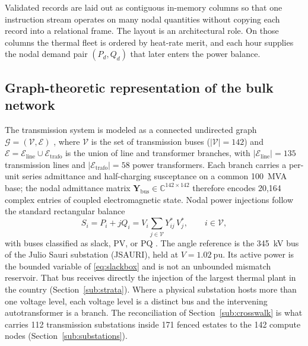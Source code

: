 Validated records are laid out as contiguous in-memory columns so that one instruction stream operates on many nodal quantities without copying each record into a relational frame. The layout is an architectural role. On those columns the thermal fleet is ordered by heat-rate merit, and each hour supplies the nodal demand pair $(P_d, Q_d)$ that later enters the power balance.

\subsection{Graph-theoretic representation of the bulk network}
\label{sub:graph}

The transmission system is modeled as a connected undirected graph $\mathcal{G} = (\mathcal{V}, \mathcal{E})$ \cite{newman2010}, where $\mathcal{V}$ is the set of transmission buses ($|\mathcal{V}| = 142$) and $\mathcal{E} = \mathcal{E}_{\mathrm{line}} \cup \mathcal{E}_{\mathrm{trafo}}$ is the union of line and transformer branches, with $|\mathcal{E}_{\mathrm{line}}| = 135$ transmission lines and $|\mathcal{E}_{\mathrm{trafo}}| = 58$ power transformers. Each branch carries a per-unit series admittance and half-charging susceptance on a common 100~MVA base; the nodal admittance matrix $\mathbf{Y}_{\mathrm{bus}} \in \mathbb{C}^{142 \times 142}$ therefore encodes 20,164 complex entries of coupled electromagnetic state. Nodal power injections follow the standard rectangular balance
\begin{equation}
S_i = P_i + jQ_i = V_i \sum_{j \in \mathcal{V}} Y_{ij}^{*}\, V_j^{*}, \qquad i \in \mathcal{V},
\label{eq:balance}
\end{equation}
with buses classified as slack, PV, or PQ \cite{tinney1967}. The angle reference is the 345~kV bus of the Julio Sauri substation (JSAURI), held at $V = 1.02\ \mathrm{pu}$. Its active power is the bounded variable of \eqref{eq:slackbox} and is not an unbounded mismatch reservoir. That bus receives directly the injection of the largest thermal plant in the country (Section~\ref{sub:strata}). Where a physical substation hosts more than one voltage level, each voltage level is a distinct bus and the intervening autotransformer is a branch. The reconciliation of Section~\ref{sub:crosswalk} is what carries 112 transmission substations inside 171 fenced estates to the 142 compute nodes (Section~\ref{sub:substations}).

